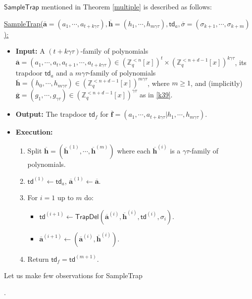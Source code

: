 \documentclass[runningheads]{llncs}
\begin{document}
{$\textsf{SampleTrap}$ mentioned in Theorem \ref{multiple} is described 
as follows:

\underline{{\textsf{SampleTrap}($\overline{\mathbf{a}}= (a_1, \cdots, a_{t+k\gamma\tau}), \overline{\mathbf{h}}= (h_1, \cdots, h_{m\gamma \tau}),\mathsf{td}_a,\overline{\sigma}=(\sigma_{k+1}, \cdots, \sigma_{k+m})$)}:}
\begin{itemize}
\item \textbf{ Input:} 
	 A $(t+k\gamma \tau)$-family of polynomials $\overline{\mathbf{a}}=(a_1,\cdots,a_t,a_{t+1},\cdots,a_{t+k\gamma \tau}) \in (\mathbb{Z}_q^{<n}[x])^t \times (\mathbb{Z}_q^{<n+d-1}[x])^{k\gamma \tau}$, its trapdoor $\mathsf{td}_a$ and a $m\gamma\tau$-family of polynomials $\overline{\textbf{h}}=(h_0, \cdots, h_{m\gamma \tau}) \in  (\mathbb{Z}_q^{<n+d-1}[x])^{m\gamma \tau}$, 
	 where $m \geq 1$, and (implicitly) $\overline{\mathbf{g}}=(g_1,\cdots, g_{\gamma \tau}) \in (\mathbb{Z}_q^{<n+d-1}[x])^{\gamma \tau}$ as in \eqref{k39}.

\item \textbf{Output:} The trapdoor $\mathsf{td}_f$ for $\overline{\textbf{f}}=(a_1,\cdots,a_{t+k\gamma\tau}|h_1, \cdots, h_{m\gamma \tau})$.
\item \textbf{Execution:}
\begin{enumerate}
	\item Split $\overline{\mathbf{h}}=(\overline{\mathbf{h}}^{(1)}, \cdots ,\overline{\mathbf{h}}^{(m)})$ where each $\overline{\mathbf{h}}^{(i)}$ is a $\gamma\tau $-family of polynomials. 

	\item $\mathsf{td}^{(1)} \leftarrow \mathsf{td}_a$, $\overline{\mathbf{a}}^{(1)}\leftarrow \overline{\mathbf{a}}$.
	\item For $i=1$ up to $m$ do:
	\begin{itemize}
		\item  $\mathsf{td}^{(i+1)} \leftarrow \mathsf{TrapDel}(\overline{\mathbf{a}}^{(i)},\overline{\mathbf{h}}^{(i)},\mathsf{td}^{(i)},\sigma_{i})$.
		\item $\overline{\mathbf{a}}^{(i+1)}\leftarrow (\overline{\mathbf{a}}^{(i)}, \overline{\mathbf{h}}^{(i)})$.
	\end{itemize}
	\item Return $\mathsf{td}_f=\mathsf{td}^{(m+1)}$.
\end{enumerate}
\end{itemize}

Let us make few observations 
for \textsf{SampleTrap}}.
\end{document}
